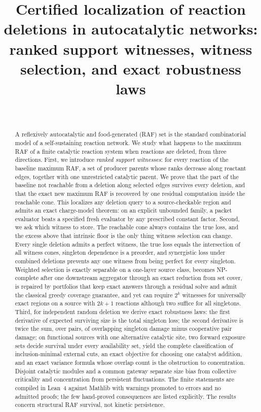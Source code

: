 \documentclass[11pt,a4paper]{article}
\title{Certified localization of reaction deletions in autocatalytic networks:\\ ranked support witnesses, witness selection, and exact robustness laws}
\author{\PaperAuthor\\ \PaperAffiliation}
\date{\PaperDate}
\theoremstyle{plain}
\theoremstyle{definition}
\theoremstyle{remark}
\begin{document}
\maketitle

\begin{abstract}
A reflexively autocatalytic and food-generated (RAF) set is the standard combinatorial model of a self-sustaining reaction network. We study what happens to the maximum RAF of a finite catalytic reaction system when reactions are deleted, from three directions. First, we introduce \emph{ranked support witnesses}: for every reaction of the baseline maximum RAF, a set of producer parents whose ranks decrease along reactant edges, together with one unrestricted catalytic parent. We prove that the part of the baseline not reachable from a deletion along selected edges survives every deletion, and that the exact new maximum RAF is recovered by one residual computation inside the reachable cone. This localizes any deletion query to a source-checkable region and admits an exact charge-model theorem: on an explicit unbounded family, a packet evaluator beats a specified fresh evaluator by any prescribed constant factor. Second, we ask which witness to store. The reachable cone always contains the true loss, and the excess above that intrinsic floor is the only thing witness selection can change. Every single deletion admits a perfect witness, the true loss equals the intersection of all witness cones, singleton dependence is a preorder, and synergistic loss under combined deletions prevents any one witness from being perfect for every singleton. Weighted selection is exactly separable on a one-layer source class, becomes NP-complete after one downstream aggregator through an exact reduction from set cover, is repaired by portfolios that keep exact answers through a residual solve and admit the classical greedy coverage guarantee, and yet can require $2^{k}$ witnesses for universally exact regions on a source with $2k+1$ reactions although two suffice for all singletons. Third, for independent random deletion we derive exact robustness laws: the first derivative of expected surviving size is the total singleton loss; the second derivative is twice the sum, over pairs, of overlapping singleton damage minus cooperative pair damage; on functional sources with one alternative catalytic site, two forward exposure sets decide survival under every availability set, yield the complete classification of inclusion-minimal external cuts, an exact objective for choosing one catalyst addition, and an exact variance formula whose overlap count is the obstruction to concentration. Disjoint catalytic modules and a common gateway separate size bias from collective criticality and concentration from persistent fluctuations. The finite statements are compiled in Lean~4 against Mathlib with warnings promoted to errors and no admitted proofs; the few hand-proved consequences are listed explicitly. The results concern structural RAF survival, not kinetic persistence.
\end{abstract}
\end{document}

